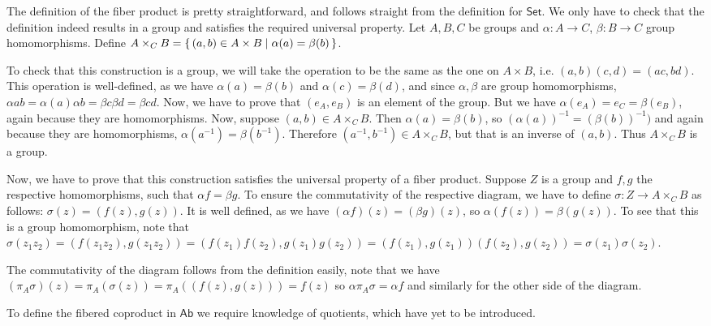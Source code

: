 \begin{problem}
\end{problem}

\begin{solution}
	The definition of the fiber product is pretty straightforward, and follows straight from the definition for $\mathsf{Set}$. We only have to check that the definition indeed results in a group and satisfies the required universal property. Let $A,B,C$ be groups and $\alpha: A \to C$, $\beta: B \to C$ group homomorphisms. Define $A \times_C B = \left\{\,(a,b) \in A \times B \mid \alpha(a)=\beta(b)\,\right\}$.
	
	To check that this construction is a group, we will take the operation to be the same as the one on $A \times B$, i.e. $(a,b)(c,d)=(ac,bd)$. This operation is well-defined, as we have $\alpha(a)=\beta(b)$ and $\alpha(c)=\beta(d)$, and since $\alpha, \beta$ are group homomorphisms, $\alpha{ab}=\alpha(a)\alpha{b}=\beta{c}\beta{d}=\beta{cd}$. Now, we have to prove that $(e_A, e_B)$ is an element of the group. But we have $\alpha(e_A)=e_C=\beta(e_B)$, again because they are homomorphisms. Now, suppose $(a,b) \in A \times_C B$. Then $\alpha(a)=\beta(b)$, so $(\alpha(a))^{-1}=(\beta(b))^{-1})$ and again because they are homomorphisms, $\alpha(a^{-1})=\beta(b^{-1})$. Therefore $(a^{-1}, b^{-1}) \in A \times_C B$, but that is an inverse of $(a, b)$. Thus $A \times_C B$ is a group.
	
	Now, we have to prove that this construction satisfies the universal property of a fiber product. Suppose $Z$ is a group and $f, g$ the respective homomorphisms, such that $\alpha f = \beta g$. To ensure the commutativity of the respective diagram, we have to define $\sigma: Z \to A \times_C B$ as follows: $\sigma(z)=(f(z),g(z))$.  It is well defined, as we have $(\alpha f)(z) = (\beta g)(z)$, so $\alpha (f(z))=\beta(g(z))$. To see that this is a group homomorphism, note that $\sigma(z_1 z_2) = (f(z_1z_2), g(z_1z_2)) = (f(z_1)f(z_2),g(z_1)g(z_2))=(f(z_1), g(z_1))(f(z_2), g(z_2))=\sigma(z_1)\sigma(z_2)$.

	The commutativity of the diagram follows from the definition easily, note that we have $(\pi_A \sigma)(z)=\pi_A(\sigma(z))=\pi_A((f(z), g(z)))=f(z)$ so $\alpha \pi_A \sigma = \alpha f$ and similarly for the other side of the diagram.
	
	To define the fibered coproduct in $\mathsf{Ab}$ we require knowledge of quotients, which have yet to be introduced.
\end{solution}

